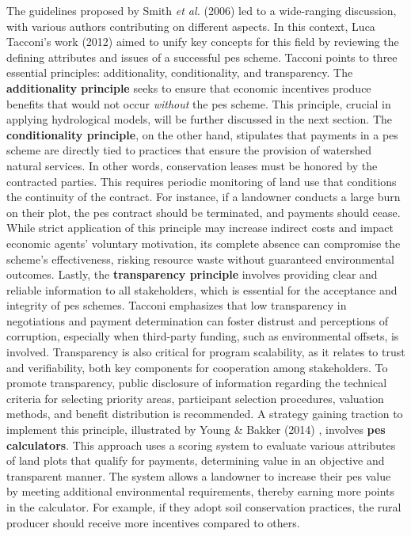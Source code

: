 \documentclass[./main_en.tex]{subfiles}
\begin{document}
\par The guidelines proposed by Smith \textit{et al.} (2006) led to a wide-ranging discussion, with various authors contributing on different aspects. In this context, Luca Tacconi's work (2012) \cite{Tacconi2012a} aimed to unify key concepts for this field by reviewing the defining attributes and issues of a successful \acrshort{pes} scheme. Tacconi points to three essential principles: additionality, conditionality, and transparency. The \textbf{additionality principle} seeks to ensure that economic incentives produce benefits that would not occur \textit{without} the \acrshort{pes} scheme. This principle, crucial in applying hydrological models, will be further discussed in the next section. The \textbf{conditionality principle}, on the other hand, stipulates that payments in a \acrshort{pes} scheme are directly tied to practices that ensure the provision of watershed natural services. In other words, conservation leases must be honored by the contracted parties. This requires periodic monitoring of land use that conditions the continuity of the contract. For instance, if a landowner conducts a large burn on their plot, the \acrshort{pes} contract should be terminated, and payments should cease. While strict application of this principle may increase indirect costs and impact economic agents' voluntary motivation, its complete absence can compromise the scheme's effectiveness, risking resource waste without guaranteed environmental outcomes. Lastly, the \textbf{transparency principle} involves providing clear and reliable information to all stakeholders, which is essential for the acceptance and integrity of \acrshort{pes} schemes. Tacconi emphasizes that low transparency in negotiations and payment determination can foster distrust and perceptions of corruption, especially when third-party funding, such as environmental offsets, is involved. Transparency is also critical for program scalability, as it relates to trust and verifiability, both key components for cooperation among stakeholders. To promote transparency, public disclosure of information regarding the technical criteria for selecting priority areas, participant selection procedures, valuation methods, and benefit distribution is recommended. A strategy gaining traction to implement this principle, illustrated by Young \& Bakker (2014) \cite{Young2014a}, involves \textbf{\acrshort{pes} calculators}. This approach uses a scoring system to evaluate various attributes of land plots that qualify for payments, determining value in an objective and transparent manner. The system allows a landowner to increase their \acrshort{pes} value by meeting additional environmental requirements, thereby earning more points in the calculator. For example, if they adopt soil conservation practices, the rural producer should receive more incentives compared to others.
\end{document}
